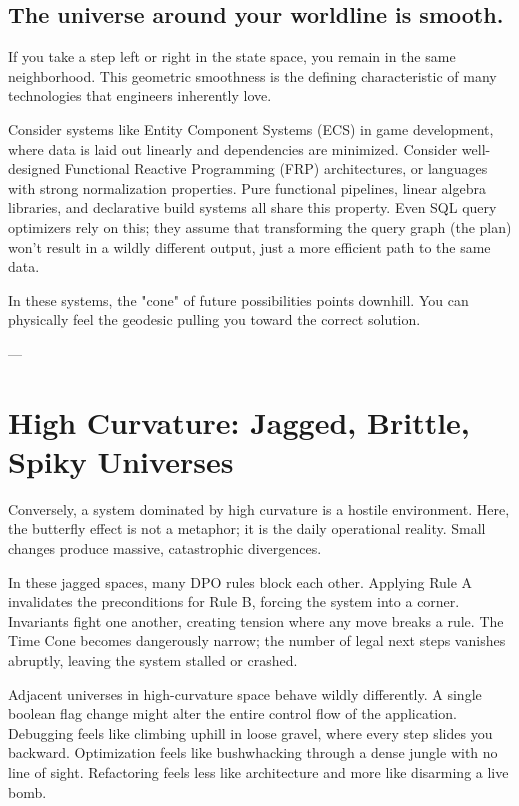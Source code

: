 \subsection{\textbf{The universe around your worldline is smooth.}}

If you take a step left or right in the state space, you remain in the same neighborhood. This geometric smoothness is the defining characteristic of many technologies that engineers inherently love.

Consider systems like Entity Component Systems (ECS) in game development, where data is laid out linearly and dependencies are minimized. Consider well-designed Functional Reactive Programming (FRP) architectures, or languages with strong normalization properties. Pure functional pipelines, linear algebra libraries, and declarative build systems all share this property. Even SQL query optimizers rely on this; they assume that transforming the query graph (the plan) won't result in a wildly different output, just a more efficient path to the same data.

In these systems, the "cone" of future possibilities points downhill. You can physically feel the geodesic pulling you toward the correct solution.

---

\section{\texorpdfstring{\textbf{High Curvature: Jagged, Brittle, Spiky Universes}}{9.3 --- High Curvature: Jagged, Brittle, Spiky Universes}}

Conversely, a system dominated by high curvature is a hostile environment. Here, the butterfly effect is not a metaphor; it is the daily operational reality. Small changes produce massive, catastrophic divergences.

In these jagged spaces, many DPO rules block each other. Applying Rule A invalidates the preconditions for Rule B, forcing the system into a corner. Invariants fight one another, creating tension where any move breaks a rule. The Time Cone becomes dangerously narrow; the number of legal next steps vanishes abruptly, leaving the system stalled or crashed.

Adjacent universes in high-curvature space behave wildly differently. A single boolean flag change might alter the entire control flow of the application. Debugging feels like climbing uphill in loose gravel, where every step slides you backward. Optimization feels like bushwhacking through a dense jungle with no line of sight. Refactoring feels less like architecture and more like disarming a live bomb.


